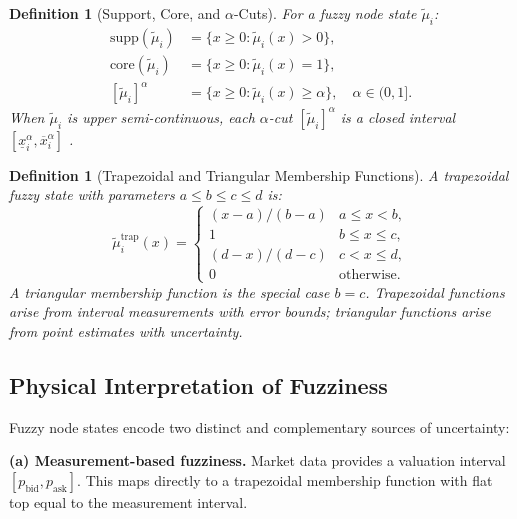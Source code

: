 \documentclass[twocolumn,10pt]{article}
\newtheorem{definition}[theorem]{Definition}
\theoremstyle{remark}
\newcommand{\fuzzyset}[1]{\tilde{\mu}_{#1}}
\begin{document}
\begin{definition}[Support, Core, and $\alpha$-Cuts]
\label{def:support_core}
For a fuzzy node state $\fuzzyset{i}$:
\begin{align}
    \text{supp}(\fuzzyset{i}) &= \{x \geq 0 : \fuzzyset{i}(x) > 0\}, \label{eq:support} \\
    \text{core}(\fuzzyset{i}) &= \{x \geq 0 : \fuzzyset{i}(x) = 1\}, \label{eq:core} \\
    [\fuzzyset{i}]^\alpha &= \{x \geq 0 : \fuzzyset{i}(x) \geq \alpha\}, \quad \alpha \in (0,1]. \label{eq:alpha_cut}
\end{align}
When $\fuzzyset{i}$ is upper semi-continuous, each $\alpha$-cut $[\fuzzyset{i}]^\alpha$ is a closed interval $[\underline{x}_i^\alpha, \overline{x}_i^\alpha]$ \cite{zadeh1978,zimmermann2001}.
\end{definition}

\begin{definition}[Trapezoidal and Triangular Membership Functions]
\label{def:trapezoidal}
A \emph{trapezoidal fuzzy state} with parameters $a \leq b \leq c \leq d$ is:
\begin{equation}
    \fuzzyset{i}^{\text{trap}}(x) = \begin{cases}
        (x-a)/(b-a) & a \leq x < b, \\
        1 & b \leq x \leq c, \\
        (d-x)/(d-c) & c < x \leq d, \\
        0 & \text{otherwise}.
    \end{cases}
    \label{eq:trapezoidal}
\end{equation}
A \emph{triangular} membership function is the special case $b = c$.  Trapezoidal functions arise from interval measurements with error bounds; triangular functions arise from point estimates with uncertainty.
\end{definition}

\subsection{Physical Interpretation of Fuzziness}

Fuzzy node states encode two distinct and complementary sources of uncertainty:

\textbf{(a) Measurement-based fuzziness.}  Market data provides a valuation interval $[p_{\text{bid}}, p_{\text{ask}}]$.  This maps directly to a trapezoidal membership function with flat top equal to the measurement interval.
\end{document}
